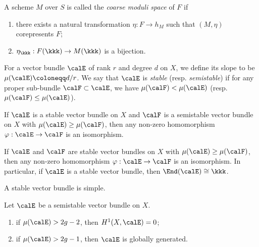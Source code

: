     \begin{definition}\label{def:coarse_moduli_space}
        A scheme \(M\) over \(S\) is called the \emph{coarse moduli space} of \(F\) if 
        \begin{enumerate}
            \item there exists a natural transformation \(\eta : F \to h_M\) such that \((M, \eta)\) corepresents \(F\);
            \item \(\eta_\kkk : F(\kkk) \to M(\kkk)\) is a bijection.
        \end{enumerate}
    \end{definition}

    For a vector bundle \(\calE\) of rank \(r\) and degree \(d\) on \(X\), we define its slope to be \(\mu(\calE) \coloneqq d/r\).
    We say that \(\calE\) is \emph{stable} (resp. \emph{semistable}) if for any proper sub-bundle \(\calF \subset \calE\), we have \(\mu(\calF) < \mu(\calE)\) (resp. \(\mu(\calF) \leq \mu(\calE)\)).

    \begin{proposition}\label{prop:homomorphism_between_semistable_and_stable_bundles}
        If \(\calE\) is a stable vector bundle on \(X\) and \(\calF\) is a semistable vector bundle on \(X\) with \(\mu(\calE) \geq \mu(\calF)\), then any non-zero homomorphism \(\varphi : \calE \to \calF\) is an isomorphism.


        If \(\calE\) and \(\calF\) are stable vector bundles on \(X\) with \(\mu(\calE) \geq \mu(\calF)\), then any non-zero homomorphism \(\varphi : \calE \to \calF\) is an isomorphism.
        In particular, if \(\calE\) is a stable vector bundle, then \(\End(\calE) \cong \kkk\).
    \end{proposition}

    \begin{corollary}\label{cor:stable_vector_bundles_are_simple}
        A stable vector bundle is simple.
    \end{corollary}

    \begin{lemma}\label{lem:vanishing_and_global_generation_of_semistable_vector_bundles}
        Let \(\calE\) be a semistable vector bundle on \(X\).
        \begin{enumerate}
            \item if \(\mu(\calE) > 2g-2\), then \(H^1(X,\calE) = 0\);
            \item if \(\mu(\calE) > 2g-1\), then \(\calE\) is globally generated.
        \end{enumerate}
    \end{lemma}

